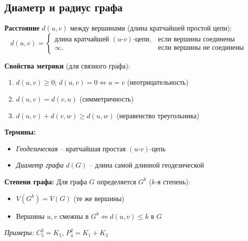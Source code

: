 \subsection{Диаметр и радиус графа}

\noindent\textbf{Расстояние} $d(u,v)$ между вершинами (длина кратчайшей простой цепи):
\[
d(u,v) = \begin{cases} 
\text{длина кратчайшей }(u\text{-}v)\text{-цепи}, & \text{если вершины соединены} \\
\infty, & \text{если вершины не соединены}
\end{cases}
\]

\noindent\textbf{Свойства метрики} (для связного графа):
\begin{enumerate}[noitemsep,topsep=0pt]
    \item $d(u,v) \geq 0$; $d(u,v) = 0 \Leftrightarrow u = v$ (неотрицательность)
    \item $d(u,v) = d(v,u)$ (симметричность)
    \item $d(u,v) + d(v,w) \geq d(u,w)$ (неравенство треугольника)
\end{enumerate}

\noindent\textbf{Термины:}
\begin{itemize}[noitemsep,topsep=0pt]
    \item \textit{Геодезическая} -- кратчайшая простая $(u\text{-}v)$-цепь
    \item \textit{Диаметр графа} $d(G)$ -- длина самой длинной геодезической
\end{itemize}

\noindent\textbf{Степени графа:} 
Для графа $G$ определяется $G^k$ ($k$-я степень):
\begin{itemize}[noitemsep,topsep=0pt]
    \item $V(G^k) = V(G)$ (те же вершины)
    \item Вершины $u,v$ смежны в $G^k \Leftrightarrow d(u,v) \leq k$ в $G$
\end{itemize}

\noindent\textit{Примеры:} $C_5^2 = K_5$, $P_4^2 = K_1 + K_3$